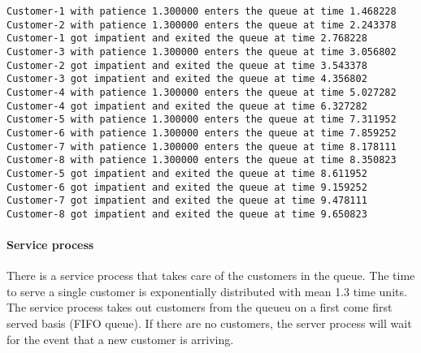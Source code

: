 \documentclass{article}
\begin{document}
    \begin{Verbatim}[commandchars=\\\{\}]
Customer-1 with patience 1.300000 enters the queue at time 1.468228
Customer-2 with patience 1.300000 enters the queue at time 2.243378
Customer-1 got impatient and exited the queue at time 2.768228
Customer-3 with patience 1.300000 enters the queue at time 3.056802
Customer-2 got impatient and exited the queue at time 3.543378
Customer-3 got impatient and exited the queue at time 4.356802
Customer-4 with patience 1.300000 enters the queue at time 5.027282
Customer-4 got impatient and exited the queue at time 6.327282
Customer-5 with patience 1.300000 enters the queue at time 7.311952
Customer-6 with patience 1.300000 enters the queue at time 7.859252
Customer-7 with patience 1.300000 enters the queue at time 8.178111
Customer-8 with patience 1.300000 enters the queue at time 8.350823
Customer-5 got impatient and exited the queue at time 8.611952
Customer-6 got impatient and exited the queue at time 9.159252
Customer-7 got impatient and exited the queue at time 9.478111
Customer-8 got impatient and exited the queue at time 9.650823
    \end{Verbatim}

    \paragraph{Service process}\label{service-process}

There is a service process that takes care of the customers in the
queue. The time to serve a single customer is exponentially distributed
with mean 1.3 time units. The service process takes out customers from
the queueu on a first come first served basis (FIFO queue). If there are
no customers, the server process will wait for the event that a new
customer is arriving.
\end{document}
